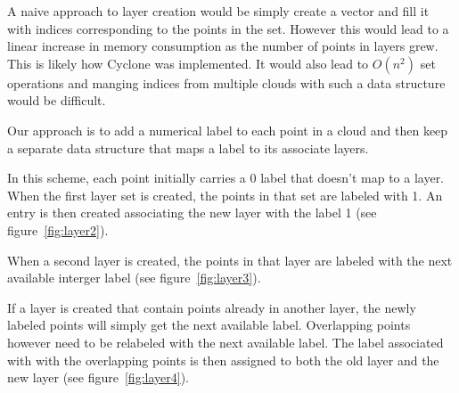 A naive approach to layer creation would be simply create a vector and fill it with indices corresponding to the points in the set. However this would lead to a linear increase in memory consumption as the number of points in layers grew. This is likely how Cyclone was implemented. It would also lead to $O(n^{2})$ set operations and manging indices from multiple clouds with such a data structure would be difficult.

Our approach is to add a numerical label to each point in a cloud and then keep a separate data structure that maps a label to its associate layers.


In this scheme, each point initially carries a 0 label that doesn't map to a layer. When the first layer set is created, the points in that set are labeled with 1. An entry is then created associating the new layer with the label 1 (see figure~\ref{fig:layer2}).

When a second layer is created, the points in that layer are labeled with the next available interger label (see figure~\ref{fig:layer3}).

If a layer is created that contain points already in another layer, the newly labeled points will simply get the next available label. Overlapping points however need to be relabeled with the next available label. The label associated with with the overlapping points is then assigned to both the old layer and the new layer (see figure~\ref{fig:layer4}).


